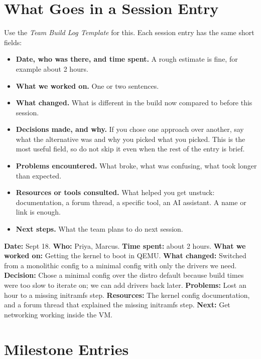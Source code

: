 \documentclass[11pt]{article}
\begin{document}
\section{What Goes in a Session Entry}

Use the \emph{Team Build Log Template} for this. Each session entry has the same short fields:

\begin{itemize}
  \item \textbf{Date, who was there, and time spent.} A rough estimate is fine, for example about 2 hours.
  \item \textbf{What we worked on.} One or two sentences.
  \item \textbf{What changed.} What is different in the build now compared to before this session.
  \item \textbf{Decisions made, and why.} If you chose one approach over another, say what the alternative was and why you picked what you picked. This is the most useful field, so do not skip it even when the rest of the entry is brief.
  \item \textbf{Problems encountered.} What broke, what was confusing, what took longer than expected.
  \item \textbf{Resources or tools consulted.} What helped you get unstuck: documentation, a forum thread, a specific tool, an AI assistant. A name or link is enough.
  \item \textbf{Next steps.} What the team plans to do next session.
\end{itemize}

\begin{tipBox}
\textbf{Date:} Sept 18. \textbf{Who:} Priya, Marcus. \textbf{Time spent:} about 2 hours. \textbf{What we worked on:} Getting the kernel to boot in QEMU. \textbf{What changed:} Switched from a monolithic config to a minimal config with only the drivers we need. \textbf{Decision:} Chose a minimal config over the distro default because build times were too slow to iterate on; we can add drivers back later. \textbf{Problems:} Lost an hour to a missing initramfs step. \textbf{Resources:} The kernel config documentation, and a forum thread that explained the missing initramfs step. \textbf{Next:} Get networking working inside the VM.
\end{tipBox}

\section{Milestone Entries}
\end{document}
